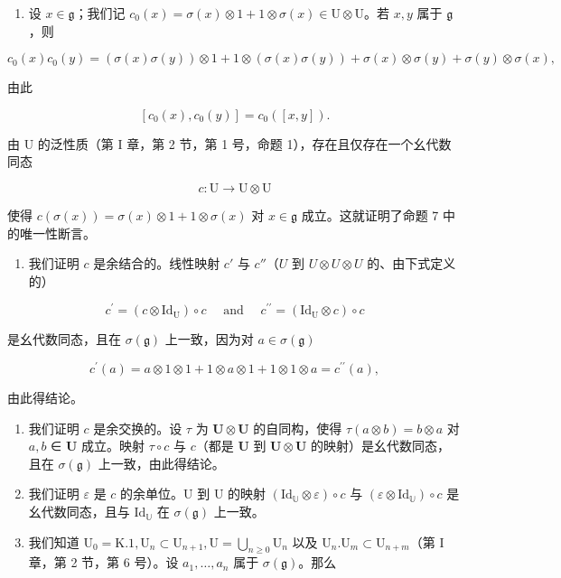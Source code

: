 \begin{enumerate}
\def\labelenumi{(\alph{enumi})}
\tightlist
\item
  设 \(x \in \mathfrak{g}\)；我们记 \(c_0(x) = \sigma(x) \otimes 1 + 1 \otimes \sigma(x) \in \mathrm{U} \otimes \mathrm{U}\)。若 \(x, y\) 属于 \(\mathfrak{g}\)，则
\end{enumerate}

\[
c _ {0} (x) c _ {0} (y) = (\sigma (x) \sigma (y)) \otimes 1 + 1 \otimes (\sigma (x) \sigma (y)) + \sigma (x) \otimes \sigma (y) + \sigma (y) \otimes \sigma (x),
\]

由此

\[
[ c _ {0} (x), c _ {0} (y) ] = c _ {0} ([ x, y ]).
\]

由 U 的泛性质（第 I 章，第 2 节，第 1 号，命题 1），存在且仅存在一个幺代数同态

\[
c \colon \mathrm{U} \to \mathrm{U} \otimes \mathrm{U}
\]

使得 \(c(\sigma(x)) = \sigma(x) \otimes 1 + 1 \otimes \sigma(x)\) 对 \(x \in \mathfrak{g}\) 成立。这就证明了命题 7 中的唯一性断言。

\begin{enumerate}
\def\labelenumi{(\alph{enumi})}
\setcounter{enumi}{1}
\tightlist
\item
  我们证明 \(c\) 是余结合的。线性映射 \(c'\) 与 \(c''\)（\(U\) 到 \(U \otimes U \otimes U\) 的、由下式定义的）
\end{enumerate}

\[
c ^ {\prime} = (c \otimes \mathrm{Id} _ {\mathrm{U}}) \circ c \quad \text { and } \quad c ^ {\prime \prime} = (\mathrm{Id} _ {\mathrm{U}} \otimes c) \circ c
\]

是幺代数同态，且在 \(\sigma (\mathfrak{g})\) 上一致，因为对 \(a\in \sigma (\mathfrak{g})\)

\[
c ^ {\prime} (a) = a \otimes 1 \otimes 1 + 1 \otimes a \otimes 1 + 1 \otimes 1 \otimes a = c ^ {\prime \prime} (a),
\]

由此得结论。

\begin{enumerate}
\def\labelenumi{(\alph{enumi})}
\setcounter{enumi}{2}
\item
  我们证明 \(c\) 是余交换的。设 \(\tau\) 为 \(\mathbf{U} \otimes \mathbf{U}\) 的自同构，使得 \(\tau(a \otimes b) = b \otimes a\) 对 \(a, b\) ∈ \(\mathbf{U}\) 成立。映射 \(\tau \circ c\) 与 \(c\)（都是 \(\mathbf{U}\) 到 \(\mathbf{U} \otimes \mathbf{U}\) 的映射）是幺代数同态，且在 \(\sigma(\mathfrak{g})\) 上一致，由此得结论。
\item
  我们证明 \(\varepsilon\) 是 \(c\) 的余单位。U 到 U 的映射 \((\mathrm{Id}_{\mathbb{U}} \otimes \varepsilon) \circ c\) 与 \((\varepsilon \otimes \mathrm{Id}_{\mathbb{U}}) \circ c\) 是幺代数同态，且与 \(\mathrm{Id}_{\mathbb{U}}\) 在 \(\sigma(\mathfrak{g})\) 上一致。
\item
  我们知道 \(\mathrm{U}_0 = \mathrm{K}.1, \mathrm{U}_n \subset \mathrm{U}_{n+1}, \mathrm{U} = \bigcup_{n \geqslant 0} \mathrm{U}_n\) 以及 \(\mathrm{U}_n. \mathrm{U}_m \subset \mathrm{U}_{n+m}\)（第 I 章，第 2 节，第 6 号）。设 \(a_1, \ldots, a_n\) 属于 \(\sigma(\mathfrak{g})\)。那么
\end{enumerate}

